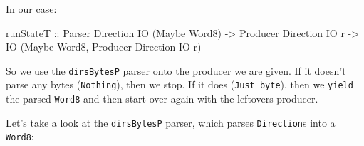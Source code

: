 \documentclass[]{article}
\newenvironment{Shaded}{}{}
\newcommand{\KeywordTok}[1]{\textcolor[rgb]{0.00,0.44,0.13}{\textbf{{#1}}}}
\newcommand{\DataTypeTok}[1]{\textcolor[rgb]{0.56,0.13,0.00}{{#1}}}
\newcommand{\DecValTok}[1]{\textcolor[rgb]{0.25,0.63,0.44}{{#1}}}
\newcommand{\CommentTok}[1]{\textcolor[rgb]{0.38,0.63,0.69}{\textit{{#1}}}}
\newcommand{\OtherTok}[1]{\textcolor[rgb]{0.00,0.44,0.13}{{#1}}}
\newcommand{\FunctionTok}[1]{\textcolor[rgb]{0.02,0.16,0.49}{{#1}}}
\newcommand{\NormalTok}[1]{{#1}}
\begin{document}
In our case:

\begin{Shaded}
\begin{Highlighting}[]
\OtherTok{runStateT ::} \DataTypeTok{Parser}   \DataTypeTok{Direction} \DataTypeTok{IO} \NormalTok{(}\DataTypeTok{Maybe} \DataTypeTok{Word8}\NormalTok{)}
          \OtherTok{->} \DataTypeTok{Producer} \DataTypeTok{Direction} \DataTypeTok{IO} \NormalTok{r}
          \OtherTok{->} \DataTypeTok{IO} \NormalTok{(}\DataTypeTok{Maybe} \DataTypeTok{Word8}\NormalTok{, }\DataTypeTok{Producer} \DataTypeTok{Direction} \DataTypeTok{IO} \NormalTok{r)}
\end{Highlighting}
\end{Shaded}

So we use the \texttt{dirsBytesP} parser onto the producer we are given.
If it doesn't parse any bytes (\texttt{Nothing}), then we stop. If it
does (\texttt{Just\ byte}), then we \texttt{yield} the parsed
\texttt{Word8} and then start over again with the leftovers producer.

Let's take a look at the \texttt{dirsBytesP} parser, which parses
\texttt{Direction}s into a \texttt{Word8}:

\begin{Shaded}
\end{Shaded}
\end{document}
